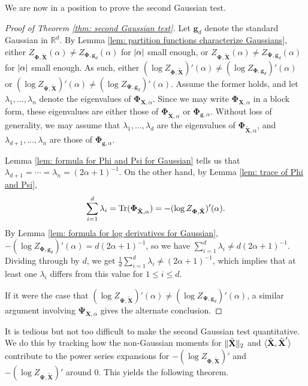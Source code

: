 \documentclass[final,12pt]{colt2018} %
\numberwithin{equation}{section}
\DeclarePairedDelimiter{\abs}{\lvert}{\rvert}
\DeclarePairedDelimiter{\norm}{\lVert}{\rVert}
\DeclarePairedDelimiter{\paren}{(}{)}
\DeclarePairedDelimiter{\inprod}{\langle}{\rangle}
\newcommand{\R}{\mathbb{R}}
\newcommand{\boldg}{\textbf{g}}
\newcommand{\boldPhi}{\boldsymbol{\Phi}}
\newcommand{\boldPsi}{\boldsymbol{\Psi}}
\newcommand{\boldX}{\textbf{X}}
\begin{document}
We are now in a position to prove the second Gaussian test.

\begin{proof}[Proof of Theorem \ref{thm: second Gaussian test}]
	Let $\boldg_d$ denote the standard Gaussian in $\R^d$. By Lemma \ref{lem: partition functions characterize Gaussians}, either $Z_{\boldPhi,\tilde{\boldX}}(\alpha) \neq Z_{\boldPhi,\boldg_d}(\alpha)$ for $\abs{\alpha}$ small enough, or $Z_{\boldPsi,\tilde{\boldX}}(\alpha) \neq Z_{\boldPsi,\boldg_d}(\alpha)$ for $\abs{\alpha}$ small enough. As such, either $(\log Z_{\boldPhi,\tilde{\boldX}})'(\alpha) \neq (\log Z_{\boldPhi,\boldg_d})'(\alpha)$ or $(\log Z_{\boldPsi,\tilde{\boldX}})'(\alpha) \neq (\log Z_{\boldPsi,\boldg_d})'(\alpha)$. Assume the former holds, and let $\lambda_1,\ldots, \lambda_n$ denote the eigenvalues of $\boldPhi_{\boldX,\alpha}$. Since we may write $\boldPhi_{\boldX,\alpha}$ in a block form, these eigenvalues are either those of $\boldPhi_{\tilde{\boldX},\alpha}$ or $\boldPhi_{\boldg,\alpha}$. Without loss of generality, we may assume that $\lambda_1,\ldots,\lambda_d$ are the eigenvalues of $\boldPhi_{\tilde{\boldX},\alpha}$, and $\lambda_{d+1},\ldots,\lambda_n$ are those of $\boldPhi_{\boldg,\alpha}$.
	
	Lemma \ref{lem: formula for Phi and Psi for Gaussian} tells us that $\lambda_{d+1} = \cdots = \lambda_n = (2\alpha+1)^{-1}$. On the other hand, by Lemma \ref{lem: trace of Phi and Psi},
	\[
	\sum_{i=1}^d\lambda_i = \textnormal{Tr}\paren{\boldPhi_{\tilde{\boldX},\alpha}} = -(\log Z_{\boldPhi,\tilde{\boldX}})'(\alpha).
	\]
	By Lemma \ref{lem: formula for log derivatives for Gaussian}, $-(\log Z_{\boldPhi,\boldg_d})'(\alpha) = d(2\alpha+1)^{-1}$, so we have $\sum_{i=1}^d\lambda_i \neq d(2\alpha+1)^{-1}$. Dividing through by $d$, we get $\frac{1}{d}\sum_{i=1}^d\lambda_i \neq (2\alpha+1)^{-1}$, which implies that at least one $\lambda_i$ differs from this value for $1 \leq i \leq d$.
	
	If it were the case that $(\log Z_{\boldPsi,\tilde{\boldX}})'(\alpha) \neq (\log Z_{\boldPsi,\boldg_d})'(\alpha)$, a similar argument involving $\boldPsi_{\boldX,\alpha}$ gives the alternate conclusion.
\end{proof}

It is tedious but not too difficult to make the second Gaussian test quantitative. We do this by tracking how the non-Gaussian moments for $\norm{\tilde{\boldX}}_2$ and $\inprod{\tilde{\boldX},\tilde{\boldX}'}$ contribute to the power series expansions for $-(\log Z_{\boldPhi,\tilde{\boldX}})'$ and $-(\log Z_{\boldPsi,\tilde{\boldX}})'$ around 0. This yields the following theorem.
\end{document}
